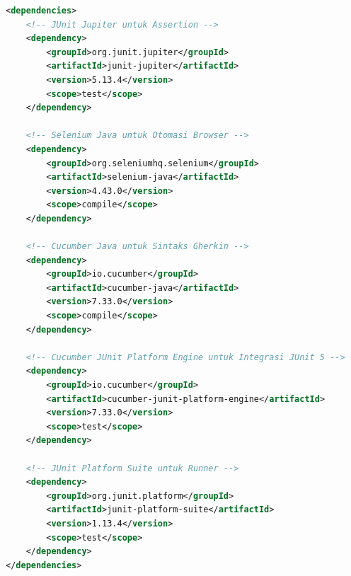 \documentclass[a4paper,oneside,11pt]{book}
\begin{document}
\begin{lstlisting}[language=XML, caption=Konfigurasi Dependensi pada pom.xml]
<dependencies>
    <!-- JUnit Jupiter untuk Assertion -->
    <dependency>
        <groupId>org.junit.jupiter</groupId>
        <artifactId>junit-jupiter</artifactId>
        <version>5.13.4</version>
        <scope>test</scope>
    </dependency>
    
    <!-- Selenium Java untuk Otomasi Browser -->
    <dependency>
        <groupId>org.seleniumhq.selenium</groupId>
        <artifactId>selenium-java</artifactId>
        <version>4.43.0</version>
        <scope>compile</scope>
    </dependency>
    
    <!-- Cucumber Java untuk Sintaks Gherkin -->
    <dependency>
        <groupId>io.cucumber</groupId>
        <artifactId>cucumber-java</artifactId>
        <version>7.33.0</version>
        <scope>compile</scope>
    </dependency>
    
    <!-- Cucumber JUnit Platform Engine untuk Integrasi JUnit 5 -->
    <dependency>
        <groupId>io.cucumber</groupId>
        <artifactId>cucumber-junit-platform-engine</artifactId>
        <version>7.33.0</version>
        <scope>test</scope>
    </dependency>
    
    <!-- JUnit Platform Suite untuk Runner -->
    <dependency>
        <groupId>org.junit.platform</groupId>
        <artifactId>junit-platform-suite</artifactId>
        <version>1.13.4</version>
        <scope>test</scope>
    </dependency>
</dependencies>
\end{lstlisting}
\end{document}
